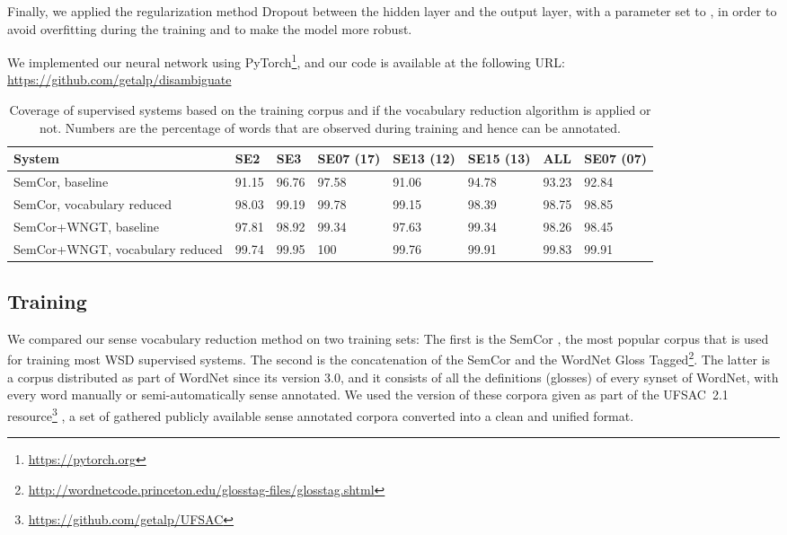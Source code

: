 \documentclass[11pt,a4paper]{article}
\begin{document}
Finally, we applied the regularization method Dropout \cite{Srivastava2014DSW26274352670313} between the hidden layer and the output layer, with a parameter set to , in order to avoid overfitting during the training and to make the model more robust.

We implemented our neural network using PyTorch\footnote{\url{https://pytorch.org}}, and our code is available at the following URL: \newline
\url{https://github.com/getalp/disambiguate}

\begin{table*}[htbp]
\small
\begin{center}
\tabulinesep=2pt
\begin{tabu} to \linewidth {X[6.5lm]X[1cm]X[1cm]X[1cm]X[1cm]X[1cm]X[1cm]X[1cm]} \toprule
System & SE2 & SE3 & SE07 (17) & SE13 (12) & SE15 (13) & ALL & SE07 (07) \\
\midrule
SemCor, baseline & 91.15 & 96.76 & 97.58 & 91.06 & 94.78 & 93.23 & 92.84 \\
 SemCor, vocabulary reduced & 98.03 & 99.19 & 99.78 & 99.15 & 98.39 & 98.75 & 98.85 \\
\midrule
SemCor+WNGT, baseline & 97.81 & 98.92 & 99.34 & 97.63 & 99.34 & 98.26 & 98.45 \\
 SemCor+WNGT, vocabulary reduced & 99.74 & 99.95 & 100 & 99.76 & 99.91 & 99.83 & 99.91 \\
\bottomrule
\end{tabu}
\end{center}
\caption{Coverage of supervised systems based on the training corpus and if the vocabulary reduction algorithm is applied or not. Numbers are the percentage of words that are observed during training and hence can be annotated.}
\label{tab:coverage}
\end{table*}

\subsection{Training}

We compared our sense vocabulary reduction method on two training sets: The first is the SemCor \citep{Miller1993}, the most popular corpus that is used for training most WSD supervised systems. The second is the concatenation of the SemCor and the WordNet Gloss Tagged\footnote{\url{http://wordnetcode.princeton.edu/glosstag-files/glosstag.shtml}}. The latter is a corpus distributed as part of WordNet since its version 3.0, and it consists of all the definitions (glosses) of every synset of WordNet, with every word manually or semi-automatically sense annotated. We used the version of these corpora given as part of the UFSAC~2.1 resource\footnote{\url{https://github.com/getalp/UFSAC}} \citep{vialhal01718237}, a set of gathered publicly available sense annotated corpora converted into a clean and unified format.  
\end{document}
